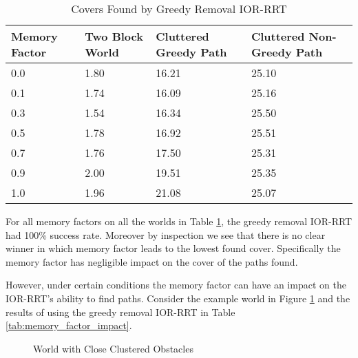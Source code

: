 \begin{table}[h!]
\centering
\begin{tabular}{@{}llll@{}}
\toprule
Memory Factor & Two Block World  & Cluttered Greedy Path  & Cluttered Non-Greedy Path \\ 
\midrule
0.0 & 1.80 & 16.21 & 25.10 \\
0.1 & 1.74 & 16.09 & 25.16 \\
0.3 & 1.54 & 16.34 & 25.50 \\
0.5 & 1.78 & 16.92 & 25.51 \\
0.7 & 1.76 & 17.50 & 25.31 \\
0.9 & 2.00 & 19.51 & 25.35 \\ 
1.0 & 1.96 & 21.08 & 25.07 \\
\bottomrule
\end{tabular}
\caption{Covers Found by Greedy Removal IOR-RRT}
\label{tab:memory_factor_no_impact}
\end{table}

For all memory factors on all the worlds in Table \ref{tab:memory_factor_no_impact}, the greedy removal IOR-RRT had 100\% success rate. Moreover by inspection we see that there is no clear winner in which memory factor leads to the lowest found cover. Specifically the memory factor has negligible impact on the cover of the paths found. 

However, under certain conditions the memory factor can have an impact on the IOR-RRT's ability to find paths. Consider the example world in Figure \ref{fig:memory_factor_world} and the results of using the greedy removal IOR-RRT in Table \ref{tab:memory_factor_impact}.

\begin{figure}[!h]
    \hfill
    \caption{World with Close Clustered Obstacles}
    \label{fig:memory_factor_world}
\end{figure}


